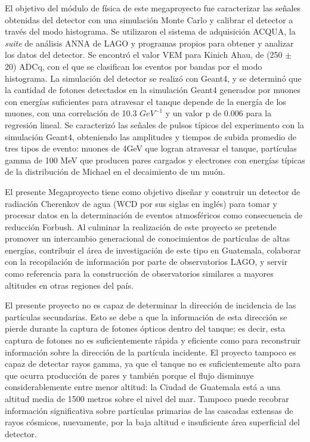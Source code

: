 \documentclass{book}
\begin{document}
\Ini

\tableofcontents 

\Figura

\Cuadros


                  
El objetivo del m\'odulo de f\'isica de este megaproyecto fue caracterizar las se\~nales obtenidas del detector con una simulaci\'on Monte Carlo y calibrar el detector a trav\'es del modo histograma. Se utilizaron el sistema de adquisici\'on ACQUA, la \textit{suite} de an\'alisis ANNA de LAGO y programas propios para obtener y analizar los datos del detector. Se encontr\'o el valor VEM para Kinich Ahau, de (250 $\pm$ 20) ADCq, con el que se clasifican los eventos por bandas por el modo histograma. La simulaci\'on del detector se realiz\'o con Geant4, y se determin\'o que la cantidad de fotones detectados en la simulaci\'on Geant4 generados por muones con energ\'ias suficientes para atravesar el tanque depende de la energ\'ia de los muones, con una correlaci\'on de 10.3 $GeV^{-1}$ y un valor p de 0.006 para la regresi\'on lineal. Se caracteriz\'o las se\~nales de pulsos t\'ipicos del experimento con la simulaci\'on Geant4, obteniendo las amplitudes y tiempos de subida promedio de tres tipos de evento: muones de 4GeV que logran atravesar el tanque, part\'iculas gamma de 100 MeV que producen pares cargados y electrones con energ\'ias t\'ipicas de la distribuci\'on de Michael en el decaimiento de un mu\'on.

\UnoA

El presente Megaproyecto tiene como objetivo dise\~nar y construir un detector de radiaci\'on Cherenkov de agua (WCD por sus siglas en ingl\'es) para tomar y procesar datos en la determinaci\'on de eventos atmosf\'ericos como consecuencia de reducci\'on Forbush. Al culminar la realizaci\'on de este proyecto se pretende promover un intercambio generacional de conocimientos de part\'iculas de altas energ\'ias, contribuir el \'area de investigaci\'on de este tipo en Guatemala, colaborar con la recopilaci\'on de informaci\'on por parte de observatorios LAGO, y servir como referencia para la construcci\'on de observatorios similares a mayores altitudes en otras regiones del pa\'is.

El presente proyecto no es capaz de determinar la direcci\'on de incidencia de las part\'iculas secundarias. Esto se debe a que la informaci\'on de esta direcci\'on se pierde durante la captura de fotones \'opticos dentro del tanque; es decir, esta captura de fotones no es suficientemente r\'apida y eficiente como para reconstruir informaci\'on sobre la direcci\'on de la part\'icula incidente. El proyecto tampoco es capaz de detectar rayos gamma, ya que el tanque no es suficientemente alto para que ocurra producci\'on de pares y tambi\'en porque el flujo disminuye considerablemente entre menor altitud: la Ciudad de Guatemala est\'a a una altitud media de 1500 metros sobre el nivel del mar. Tampoco puede recobrar informaci\'on significativa sobre part\'iculas primarias de las cascadas extensas de rayos c\'osmicos, nuevamente, por la baja altitud e insuficiente \'area superficial del detector.
\end{document}
